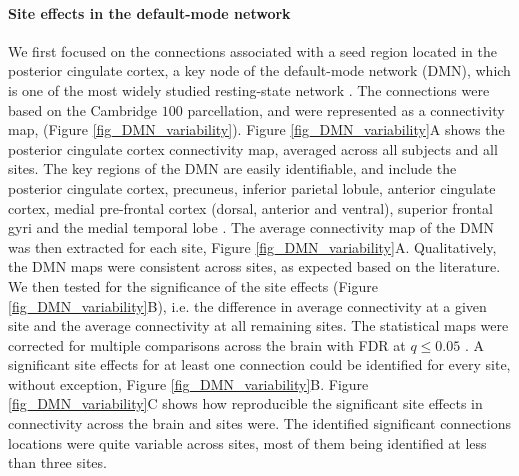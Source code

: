 \documentclass[authoryear]{elsarticle}
\begin{document}
\paragraph{Site effects in the default-mode network} We first focused on the
connections associated with a seed region located in the posterior cingulate cortex, a key
node of the default-mode network (DMN), which is one of the most widely studied
resting-state network \citep{Greicius2004}. The connections were based on the
Cambridge $100$ parcellation, and were represented as a connectivity map, (Figure
\ref{fig_DMN_variability}). Figure \ref{fig_DMN_variability}A shows the posterior cingulate cortex
connectivity map, averaged across all subjects and all sites. The key regions of
the DMN are easily identifiable, and include the posterior cingulate cortex, precuneus, inferior
parietal lobule, anterior cingulate cortex, medial pre-frontal cortex (dorsal,
anterior and ventral), superior frontal gyri and the medial temporal lobe
\citep{Damoiseaux2006,Dansereau2014,Yan2013a}. The average
connectivity map of the DMN was then extracted for each site, Figure
\ref{fig_DMN_variability}A. Qualitatively, the DMN maps were consistent across
sites, as expected based on the literature. We then tested for the significance
of the site effects (Figure \ref{fig_DMN_variability}B), i.e. the difference in average connectivity at a given site
and the average connectivity at all remaining sites. The statistical maps were
corrected for multiple comparisons across the brain with FDR at $q\leq 0.05$
\citep{Benjamini1995}. A significant site effects for at least one connection could be
identified for every site, without exception, Figure
\ref{fig_DMN_variability}B. Figure \ref{fig_DMN_variability}C shows how
reproducible the significant site effects in connectivity across the brain and
sites were. The identified significant connections locations were quite variable across sites, most of them being
identified at less than three sites.
\end{document}
